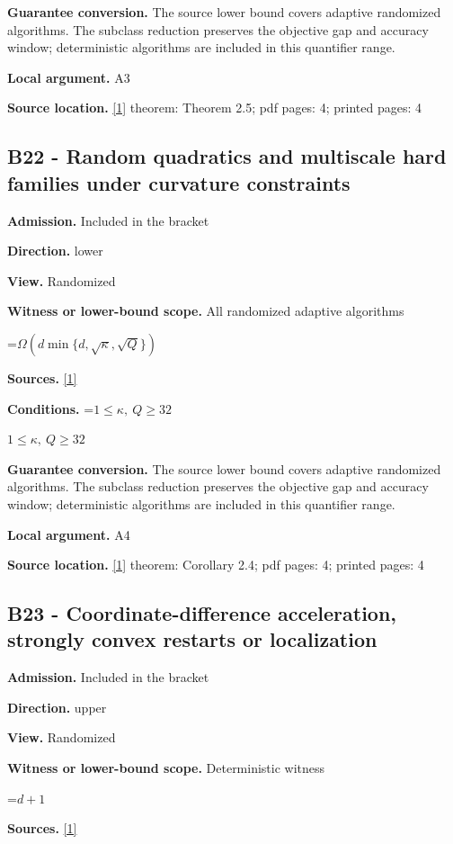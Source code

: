 \documentclass[10pt,a4paper]{article}
\newcommand{\AtlasMath}[1]{\par\begingroup\centering\setbox0=\hbox{$\displaystyle #1$}\ifdim\wd0>1.4\linewidth\typeout{ATLAS WIDE FORMULA: \the\wd0}\fi\ifdim\wd0>\linewidth\resizebox{\linewidth}{!}{\box0}\else\box0\fi\par\endgroup}
\newcommand{\AtlasInlineMath}[1]{\begingroup\setbox0=\hbox{$#1$}\ifdim\wd0>.4\linewidth\endgroup\AtlasMath{#1}\else\endgroup$#1$\fi}
\begin{document}
\textbf{Guarantee conversion.} The source lower bound covers adaptive randomized algorithms. The subclass reduction preserves the objective gap and accuracy window; deterministic algorithms are included in this quantifier range.

\textbf{Local argument.} A3

\textbf{Source location.} \href{https://arxiv.org/html/2610.00345v1}{[1]} theorem: Theorem 2.5; pdf pages: 4; printed pages: 4

\subsection{B22 - Random quadratics and multiscale hard families under curvature constraints}
\textbf{Admission.} Included in the bracket

\textbf{Direction.} lower

\textbf{View.} Randomized

\textbf{Witness or lower-bound scope.} All randomized adaptive algorithms

\AtlasMath{\Omega(d\min\{d,\sqrt\kappa,\sqrt Q\})}
\textbf{Sources.} \href{https://arxiv.org/html/2610.00345v1}{[1]}

\textbf{Conditions.} \AtlasInlineMath{1\le\kappa,\ Q\ge32}

\textbf{Guarantee conversion.} The source lower bound covers adaptive randomized algorithms. The subclass reduction preserves the objective gap and accuracy window; deterministic algorithms are included in this quantifier range.

\textbf{Local argument.} A4

\textbf{Source location.} \href{https://arxiv.org/html/2610.00345v1}{[1]} theorem: Corollary 2.4; pdf pages: 4; printed pages: 4

\subsection{B23 - Coordinate-difference acceleration, strongly convex restarts or localization}
\textbf{Admission.} Included in the bracket

\textbf{Direction.} upper

\textbf{View.} Randomized

\textbf{Witness or lower-bound scope.} Deterministic witness

\AtlasMath{d+1}
\textbf{Sources.} \href{https://arxiv.org/html/2610.00345v1}{[1]}
\end{document}
